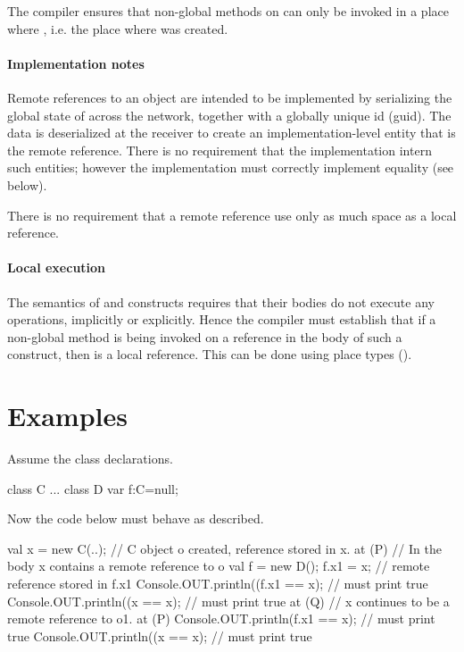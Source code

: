 The \Xten{} compiler ensures that non-global methods on  can
only be invoked in a place where , i.e. the place
where  was created.

\paragraph{Implementation notes}
Remote references to an object  are intended to be implemented
by serializing the global state of  across the network,
together with a globally unique id (guid). The data is deserialized at
the receiver to create an implementation-level entity that is the
remote reference. There is no requirement that the implementation
intern such entities; however the implementation must correctly
implement equality (see below).

There is no requirement that a remote reference use only as much space as a local reference.

  
\paragraph{Local execution}
 The semantics of  and  constructs requires that their
 bodies do not execute any  operations, implicitly or
 explicitly. Hence the compiler must establish that if a non-global method
 is being invoked on a reference  in the body of such a construct,
 then  is a local reference. This can be done using place types ().

  
\section{Examples}
Assume the class declarations. 

\begin{xten}
class C { ...} 
class D {
   var f:C=null;
}
\end{xten}
 
Now the code below must behave as described.
\begin{xten}
val x = new C(..); 
// C object o created, reference stored in x. 
at (P) { 
      // In the body x contains a remote reference to o
      val f = new D();
      f.x1  = x; // remote reference stored in f.x1
      Console.OUT.println((f.x1 == x);       // must print true
      Console.OUT.println((x == x);          // must print true
      at (Q) { 
         // x continues to be a remote reference to o1.
         at (P) {  
             Console.OUT.println(f.x1 == x);   // must print true
             Console.OUT.println((x == x);   // must print true
         }
      }
}
\end{xten}
  

